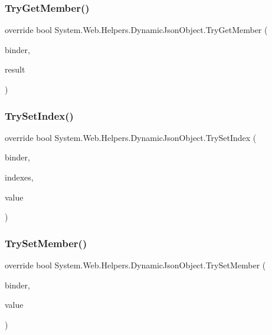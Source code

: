 \subsubsection{\texorpdfstring{Try\+Get\+Member()}{TryGetMember()}}
{\footnotesize\ttfamily override bool System.\+Web.\+Helpers.\+Dynamic\+Json\+Object.\+Try\+Get\+Member (\begin{DoxyParamCaption}\item[{Get\+Member\+Binder}]{binder,  }\item[{out object}]{result }\end{DoxyParamCaption})}

\mbox{\label{classSystem_1_1Web_1_1Helpers_1_1DynamicJsonObject_a6d9229dd7bc1149540e8c71b3755ed87_a6d9229dd7bc1149540e8c71b3755ed87}} 
\subsubsection{\texorpdfstring{Try\+Set\+Index()}{TrySetIndex()}}
{\footnotesize\ttfamily override bool System.\+Web.\+Helpers.\+Dynamic\+Json\+Object.\+Try\+Set\+Index (\begin{DoxyParamCaption}\item[{Set\+Index\+Binder}]{binder,  }\item[{object \mbox{[}$\,$\mbox{]}}]{indexes,  }\item[{object}]{value }\end{DoxyParamCaption})}

\mbox{\label{classSystem_1_1Web_1_1Helpers_1_1DynamicJsonObject_a2751e8fe84adaf0dd4c3430224b10203_a2751e8fe84adaf0dd4c3430224b10203}} 
\subsubsection{\texorpdfstring{Try\+Set\+Member()}{TrySetMember()}}
{\footnotesize\ttfamily override bool System.\+Web.\+Helpers.\+Dynamic\+Json\+Object.\+Try\+Set\+Member (\begin{DoxyParamCaption}\item[{Set\+Member\+Binder}]{binder,  }\item[{object}]{value }\end{DoxyParamCaption})}

